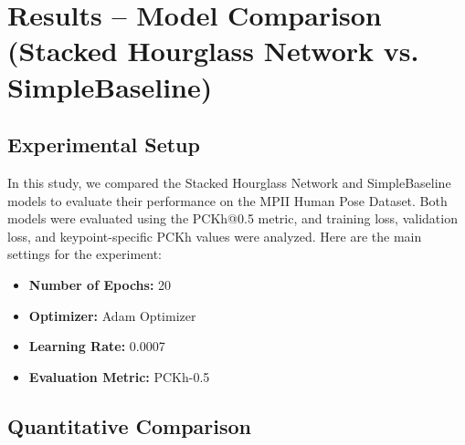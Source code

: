 \documentclass{article}
\begin{document}
\section{Results – Model Comparison (Stacked Hourglass Network vs. SimpleBaseline)}

\subsection{Experimental Setup}
In this study, we compared the Stacked Hourglass Network and SimpleBaseline models to evaluate their performance on the MPII Human Pose Dataset. Both models were evaluated using the PCKh@0.5 metric, and training loss, validation loss, and keypoint-specific PCKh values were analyzed.
Here are the main settings for the experiment:

\begin{itemize}
\item \textbf{Number of Epochs:} 20
\item  \textbf{Optimizer:} Adam Optimizer
\item  \textbf{Learning Rate:} 0.0007
\item  \textbf{Evaluation Metric:} PCKh-0.5
\end{itemize}

\subsection{Quantitative Comparison}
\end{document}
